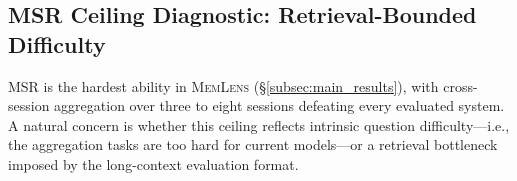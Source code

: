 \documentclass{article}
\newcommand{\bench}{\textsc{MemLens}}
\begin{document}






\subsection{MSR Ceiling Diagnostic: Retrieval-Bounded Difficulty}
\label{app:msr_ceiling}

MSR is the hardest ability in \bench{} (\S\ref{subsec:main_results}), with cross-session aggregation over three to eight sessions defeating every evaluated system. A natural concern is whether this ceiling reflects intrinsic question difficulty---i.e., the aggregation tasks are too hard for current models---or a retrieval bottleneck imposed by the long-context evaluation format.
\end{document}
